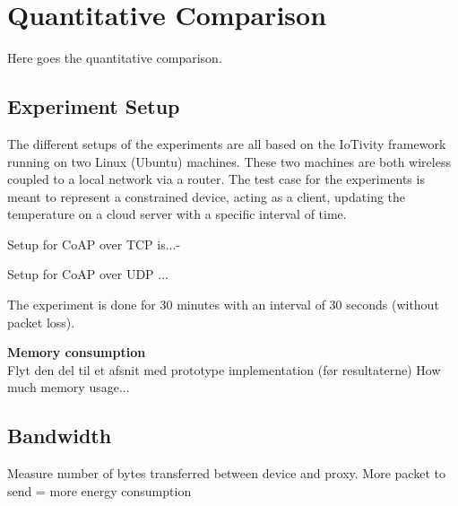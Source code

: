 \section{Quantitative Comparison}
Here goes the quantitative comparison.

\subsection{Experiment Setup}
The different setups of the experiments are all based on the IoTivity framework running on two Linux (Ubuntu) machines.  These two machines are both wireless coupled to a local network via a router. The test case for the experiments is meant to represent a constrained device, acting as a client, updating the temperature on a cloud server with a specific interval of time. 

Setup for CoAP over TCP is...-

Setup for CoAP over UDP ...

The experiment is done  for 30 minutes with an interval of 30 seconds (without packet loss).

\textbf{Memory consumption}\\
Flyt den del til et afsnit med prototype implementation (før resultaterne)
How much memory usage...

\subsection{Bandwidth}
Measure number of bytes transferred between device and proxy.
More packet to send = more energy consumption

